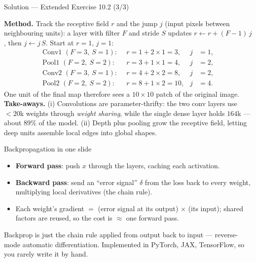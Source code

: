 \documentclass[aspectratio=169,11pt]{beamer}
\begin{document}
\begin{frame}{Solution --- Extended Exercise 10.2 (3/3)}
\begin{solutionbox}
  \textbf{Method.} Track the receptive field $r$ and the jump $j$ (input
  pixels between neighbouring units): a layer with filter $F$ and stride $S$
  updates $r \leftarrow r + (F-1)\,j$, then $j \leftarrow j\,S$. Start at
  $r=1$, $j=1$:
  \[
    \begin{aligned}
      \text{Conv1 } (F{=}3,\ S{=}1):&\ \ r = 1 + 2\times1 = 3, & j &= 1,\\
      \text{Pool1 } (F{=}2,\ S{=}2):&\ \ r = 3 + 1\times1 = 4, & j &= 2,\\
      \text{Conv2 } (F{=}3,\ S{=}1):&\ \ r = 4 + 2\times2 = 8, & j &= 2,\\
      \text{Pool2 } (F{=}2,\ S{=}2):&\ \ r = 8 + 1\times2 = 10, & j &= 4.
    \end{aligned}
  \]
  One unit of the final map therefore sees a $10\times10$ patch of the original image.
  \medskip
  \textbf{Take-aways.} (i) Convolutions are parameter-thrifty: the two conv layers use
  $<20$k weights through \emph{weight sharing}, while the single dense layer holds $164$k
  --- about $89\%$ of the model. (ii) Depth plus pooling grow the receptive field, letting
  deep units assemble local edges into global shapes.
\end{solutionbox}
\end{frame}

\begin{frame}{Backpropagation in one slide}
  \begin{readme}
    \begin{itemize}
      \item \textbf{Forward pass}: push $x$ through the layers, caching each
            activation.
      \item \textbf{Backward pass}: send an ``error signal'' $\delta$ from the loss
            back to every weight, multiplying local derivatives (the chain rule).
      \item Each weight's gradient $=$ (error signal at its output) $\times$ (its
            input); shared factors are reused, so the cost is $\approx$ one forward
            pass.
    \end{itemize}
  \end{readme}
  \begin{takeaway}
    Backprop is just the chain rule applied from output back to input --- reverse-mode
    automatic differentiation. Implemented in PyTorch, JAX, TensorFlow, so you rarely
    write it by hand.
  \end{takeaway}
\end{frame}
\end{document}
